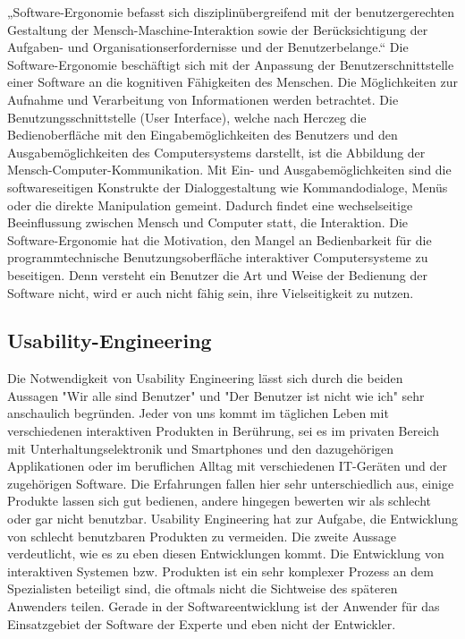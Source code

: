 \documentclass[a4paper, 12pt, twoside, BCOR=20mm, DIV=calc, abstracton, parskip=half*, toc=bibliography, toc=listof, headsepline, footsepline, headings=small, numbers=enddot]{scrreprt}
\begin{document}
	„Software-Ergonomie befasst sich disziplinübergreifend mit der benutzergerechten Gestaltung der Mensch-Maschine-Interaktion sowie der Berücksichtigung der Aufgaben- und Organisationserfordernisse und der Benutzerbelange.“ \cite[S. 7]{zeidler1992software}
	Die Software-Ergonomie beschäftigt sich mit der Anpassung der Benutzerschnittstelle einer Software an die kognitiven Fähigkeiten des Menschen. Die Möglichkeiten zur Aufnahme und Verarbeitung von Informationen werden betrachtet. Die Benutzungsschnittstelle (User Interface), welche nach Herczeg\cite{herczeg2005software} die Bedienoberfläche mit den Eingabemöglichkeiten des Benutzers und den Ausgabemöglichkeiten des Computersystems darstellt, ist die Abbildung der Mensch-Computer-Kommunikation. 
	Mit Ein- und Ausgabemöglichkeiten sind die softwareseitigen Konstrukte der Dialoggestaltung wie Kommandodialoge, Menüs oder die direkte Manipulation gemeint. Dadurch findet eine wechselseitige Beeinflussung zwischen Mensch und Computer statt, die Interaktion.
	Die Software-Ergonomie hat die Motivation, den Mangel an Bedienbarkeit für die programmtechnische Benutzungsoberfläche interaktiver Computersysteme zu beseitigen. Denn versteht ein Benutzer die Art und Weise der Bedienung der Software nicht, wird er auch nicht fähig sein, ihre Vielseitigkeit zu nutzen.
	
	\subsection{Usability-Engineering}
\cite{rudlof2006handbuch}

Die Notwendigkeit von Usability Engineering lässt sich durch die beiden Aussagen "Wir alle sind Benutzer" und "Der Benutzer ist nicht wie ich" \cite{richter2010usability} sehr anschaulich begründen. Jeder von uns kommt im täglichen Leben mit verschiedenen interaktiven Produkten in Berührung, sei es im privaten Bereich mit Unterhaltungselektronik und Smartphones und den dazugehörigen Applikationen oder im beruflichen Alltag mit verschiedenen IT-Geräten und der zugehörigen Software. Die Erfahrungen fallen hier sehr unterschiedlich aus, einige Produkte lassen sich gut bedienen, andere hingegen bewerten wir als schlecht oder gar nicht benutzbar. Usability Engineering hat zur Aufgabe, die Entwicklung von schlecht benutzbaren Produkten zu vermeiden. Die zweite Aussage verdeutlicht, wie es zu eben diesen Entwicklungen kommt. Die Entwicklung von interaktiven Systemen bzw. Produkten ist ein sehr komplexer Prozess an dem Spezialisten beteiligt sind, die oftmals nicht die Sichtweise des späteren Anwenders teilen. Gerade in der Softwareentwicklung ist der Anwender für das Einsatzgebiet der Software der Experte und eben nicht der Entwickler\cite[vgl. S. 1ff]{richter2010usability}. 
		
\end{document}
